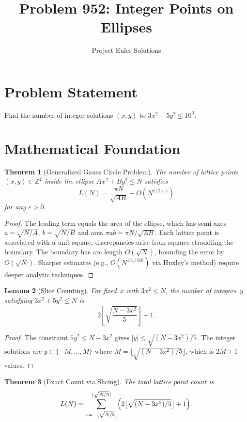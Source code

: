 \documentclass[11pt]{article}
\title{Problem 952: Integer Points on Ellipses}
\author{Project Euler Solutions}
\date{}
\newtheorem{theorem}{Theorem}
\newtheorem{lemma}[theorem]{Lemma}
\begin{document}
\maketitle

\section{Problem Statement}

Find the number of integer solutions $(x, y)$ to $3x^2 + 5y^2 \le 10^6$.

\section{Mathematical Foundation}

\begin{theorem}[Generalized Gauss Circle Problem]
The number of lattice points $(x, y) \in \mathbb{Z}^2$ inside the ellipse $Ax^2 + By^2 \le N$ satisfies
\[
L(N) = \frac{\pi N}{\sqrt{AB}} + O(N^{1/2+\varepsilon})
\]
for any $\varepsilon > 0$.
\end{theorem}

\begin{proof}
The leading term equals the area of the ellipse, which has semi-axes $a = \sqrt{N/A}$, $b = \sqrt{N/B}$ and area $\pi ab = \pi N/\sqrt{AB}$. Each lattice point is associated with a unit square; discrepancies arise from squares straddling the boundary. The boundary has arc length $O(\sqrt{N})$, bounding the error by $O(\sqrt{N})$. Sharper estimates (e.g., $O(N^{131/416})$ via Huxley's method) require deeper analytic techniques.
\end{proof}

\begin{lemma}[Slice Counting]
\label{lem:slice}
For fixed~$x$ with $3x^2 \le N$, the number of integers~$y$ satisfying $3x^2 + 5y^2 \le N$ is
\[
2\left\lfloor\sqrt{\frac{N-3x^2}{5}}\right\rfloor + 1.
\]
\end{lemma}

\begin{proof}
The constraint $5y^2 \le N - 3x^2$ gives $|y| \le \sqrt{(N-3x^2)/5}$. The integer solutions are $y \in \{-M, \ldots, M\}$ where $M = \lfloor\sqrt{(N-3x^2)/5}\rfloor$, which is $2M+1$ values.
\end{proof}

\begin{theorem}[Exact Count via Slicing]
The total lattice point count is
\[
L(N) = \sum_{x=-\lfloor\sqrt{N/3}\rfloor}^{\lfloor\sqrt{N/3}\rfloor} \Bigl(2\bigl\lfloor\sqrt{(N-3x^2)/5}\bigr\rfloor + 1\Bigr).
\]
\end{theorem}
\end{document}
